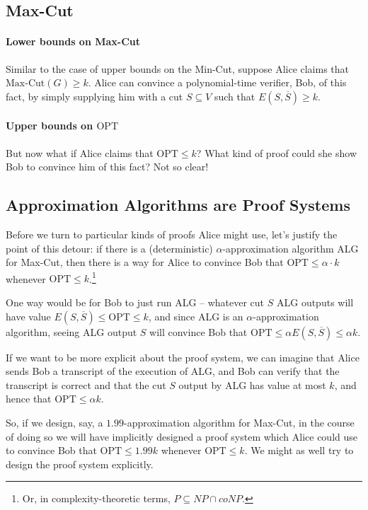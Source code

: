 \documentclass[11pt]{article}
\newcommand{\OPT}{\text{OPT}}
\begin{document}
\subsection{Max-Cut}
\paragraph{Lower bounds on Max-Cut} Similar to the case of upper bounds on the Min-Cut, suppose Alice claims that $\text{Max-Cut}(G) \geq k$.
Alice can convince a polynomial-time verifier, Bob, of this fact, by simply supplying him with a cut $S \subseteq V$ such that $E(S,\overline{S}) \geq k$.

\paragraph{Upper bounds on $\OPT$} But now what if Alice claims that $\OPT \leq k$?
What kind of proof could she show Bob to convince him of this fact?
Not so clear!

\subsection{Approximation Algorithms are Proof Systems}
Before we turn to particular kinds of proofs Alice might use, let's justify the point of this detour: if there is a (deterministic) $\alpha$-approximation algorithm ALG for Max-Cut, then there is a way for Alice to convince Bob that $\OPT \leq \alpha \cdot k$ whenever $\OPT \leq k$.\footnote{Or, in complexity-theoretic terms, $P \subseteq NP \cap coNP$.}

One way would be for Bob to just run ALG -- whatever cut $S$ ALG outputs will have value $E(S,\overline{S}) \leq \OPT \leq k$, and since ALG is an $\alpha$-approximation algorithm, seeing ALG output $S$ will convince Bob that $\OPT \leq \alpha E(S,\overline{S}) \leq \alpha k$.

If we want to be more explicit about the proof system, we can imagine that Alice sends Bob a transcript of the execution of ALG, and Bob can verify that the transcript is correct and that the cut $S$ output by ALG has value at most $k$, and hence that $\OPT \leq \alpha k$.

So, if we design, say, a $1.99$-approximation algorithm for Max-Cut, in the course of doing so we will have implicitly designed a proof system which Alice could use to convince Bob that $\OPT \leq 1.99 k$ whenever $\OPT \leq k$.
We might as well try to design the proof system explicitly.
\end{document}

